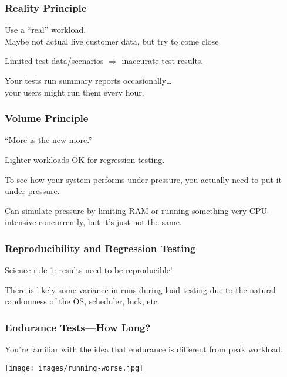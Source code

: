 \begin{frame}
\frametitle{Reality Principle}


Use a ``real'' workload.\\
\quad Maybe not actual live customer data, but try to come close.

Limited test data/scenarios $\Rightarrow$ inaccurate test results.


Your tests run summary reports occasionally\ldots\\
\quad your users might run them every hour. 

\end{frame}



\begin{frame}
\frametitle{Volume Principle}


``More is the new more.'' 

Lighter workloads OK for regression testing. 

To see how your system performs under pressure, you actually need to put it under pressure. 

Can simulate pressure by limiting RAM or running something very CPU-intensive concurrently, but it's just not the same.

\end{frame}



\begin{frame}
\frametitle{Reproducibility and Regression Testing}

Science rule 1: results need to be reproducible!


There is likely some variance in runs during load testing due to the natural randomness of the OS, scheduler, luck, etc.


\end{frame}


\begin{frame}
\frametitle{Endurance Tests---How Long?}

You're familiar with the idea that endurance is different from peak workload.

\begin{center}
  \texttt{[image: images/running-worse.jpg]}
\end{center}

\end{frame}

